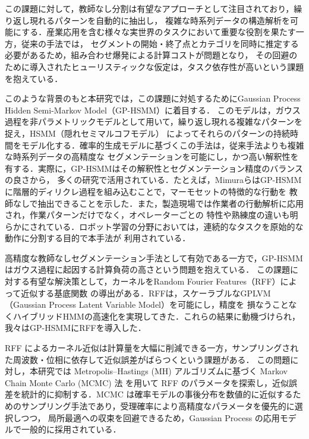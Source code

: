 \documentclass[conference]{IEEEtran}
\begin{document}
この課題に対して，教師なし分割\cite{Fox2011, Matsubara2014, Sener2018, Bojanowski2014, Huang2016, Richard2017}は有望なアプローチとして注目されており，繰り返し現れるパターンを自動的に抽出し，
複雑な時系列データの構造解析を可能にする．産業応用を含む様々な実世界のタスクにおいて重要な役割を果たす一方，従来の手法では，
セグメントの開始・終了点とカテゴリを同時に推定する必要があるため，組み合わせ爆発による計算コストが問題となり，
その回避のために導入されたヒューリスティックな仮定は，タスク依存性が高いという課題を抱えている．

このような背景のもと本研究では，この課題に対処するためにGaussian Process Hidden Semi-Markov Model（GP-HSMM）\cite{Nakamura2017}に着目する．
このモデルは，ガウス過程を非パラメトリックモデルとして用いて，繰り返し現れる複雑なパターンを捉え，HSMM（隠れセミマルコフモデル）
によってそれらのパターンの持続時間をモデル化する．確率的生成モデルに基づくこの手法は，従来手法よりも複雑な時系列データの高精度な
セグメンテーションを可能にし，かつ高い解釈性を有する．実際に，GP-HSMMはその解釈性とセグメンテーション精度のバランスの良さから，
多くの研究で活用されている．たとえば，MimuraらはGP-HSMMに階層的ディリクレ過程を組み込むことで，マーモセットの特徴的な行動を
教師なしで抽出できることを示した\cite{Mimura2024}．また，製造現場では作業者の行動解析に応用され，作業パターンだけでなく，オペレーターごとの
特性や熟練度の違いも明らかにされている\cite{Saito2023a}．ロボット学習の分野においては，連続的なタスクを原始的な動作に分割する目的で本手法が
利用されている\cite{Mo2023}．

高精度な教師なしセグメンテーション手法として有効である一方で，GP-HSMMはガウス過程に起因する計算負荷の高さという問題を抱えている．
この課題に対する有望な解決策として，カーネルをRandom Fourier Features（RFF）によって近似する基底関数
の導出がある\cite{Rahimi2007}．RFFは，スケーラブルなGPLVM（Gaussian Process Latent Variable Model）\cite{Zhang2023}\cite{Li2024}を可能にし，精度を
損なうことなくハイブリッドHMMの高速化を実現してきた\cite{Jung2020}．これらの結果に動機づけられ，我々はGP-HSMMにRFFを導入した．

RFF によるカーネル近似は計算量を大幅に削減できる一方，サンプリングされた周波数・位相に依存して近似誤差がばらつくという課題がある．
この問題に対し，本研究では Metropolis–Hastings (MH) アルゴリズムに基づく Markov Chain Monte Carlo (MCMC) 法 \cite{Hastings1970} を用いて 
RFF のパラメータを探索し，近似誤差を統計的に抑制する．MCMC は確率モデルの事後分布を数値的に近似するためのサンプリング手法であり，受理確率により高精度なパラメータを優先的に選択しつつ，
局所最適への収束を回避できるため，Gaussian Process の応用モデルで一般的に採用されている\cite{Neal1997}．
\end{document}
